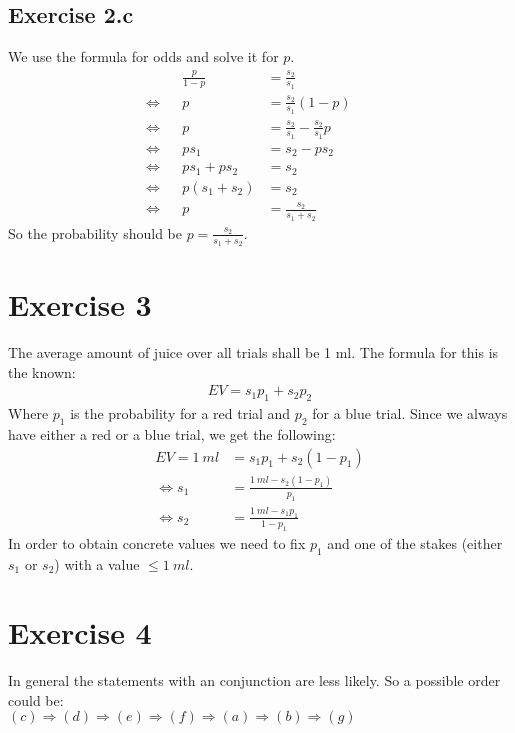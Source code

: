 \documentclass{article}
\begin{document}
\subsection*{Exercise 2.c}
We use the formula for odds and solve it for $p$.
\begin{align}
                & & \frac{p}{1 - p} & = \frac{s_2}{s_1}                     & & \\
\Leftrightarrow & & p               & = \frac{s_2}{s_1} (1 - p)             & & \\
\Leftrightarrow & & p               & = \frac{s_2}{s_1} - \frac{s_2}{s_1} p & & \\
\Leftrightarrow & & p s_1           & = s_2 - p s_2                         & & \\
\Leftrightarrow & & p s_1 + p s_2   & = s_2                                 & & \\
\Leftrightarrow & & p (s_1 + s_2)   & = s_2                                 & & \\
\Leftrightarrow & & p               & = \frac{s_2}{s_1 + s_2}               & &
\end{align}
So the probability should be $p = \frac{s_2}{s_1 + s_2}$.

\setcounter{equation}{0}
\section*{Exercise 3}
The average amount of juice over all trials shall be 1 ml. The formula for this 
is the known:
\begin{align}
EV = s_1 p_1 + s_2 p_2
\end{align}
Where $p_1$ is the probability for a red trial and $p_2$ for a blue trial. 
Since we always have either a red or a blue trial, we get the following:
\begin{align}
EV = 1 \  ml &= s_1 p_1 + s_2 (1 - p_1)\\
\Leftrightarrow s_1 &= \frac{1 \  ml - s_2 (1 - p_1)}{p_1}\\
\Leftrightarrow s_2 &= \frac{1 \  ml - s_1 p_1}{1 - p_1}
\end{align}
In order to obtain concrete values we need to fix $p_1$ and one of the stakes 
(either $s_1$ or $s_2$) with a value $\leq 1 \  ml$.


\section*{Exercise 4}
In general the statements with an conjunction are less likely. So a possible order could be:\\
$(c)\Rightarrow(d)\Rightarrow(e)\Rightarrow(f)\Rightarrow(a)\Rightarrow(b)\Rightarrow(g)$
\end{document}
